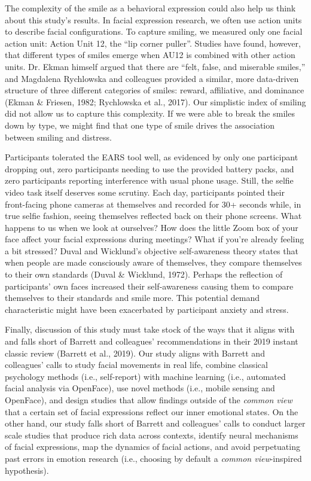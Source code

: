 \documentclass[authordate, empirical,issue]{jote-new-article}
\begin{document}
The complexity of the smile as a behavioral expression could also help us think about this study's results. In facial expression research, we often use action units to describe facial configurations. To capture smiling, we measured only one facial action unit: Action Unit 12, the “lip corner puller”. Studies have found, however, that different types of smiles emerge when AU12 is combined with other action units. Dr. Ekman himself argued that there are “felt, false, and miserable smiles,” and Magdalena Rychlowska and colleagues provided a similar, more data-driven structure of three different categories of smiles: reward, affiliative, and dominance (Ekman \& Friesen, 1982; Rychlowska et al., 2017). Our simplistic index of smiling did not allow us to capture this complexity. If we were able to break the smiles down by type, we might find that one type of smile drives the association between smiling and distress.



Participants tolerated the EARS tool well, as evidenced by only one participant dropping out, zero participants needing to use the provided battery packs, and zero participants reporting interference with usual phone usage. Still, the selfie video task itself deserves some scrutiny. Each day, participants pointed their front-facing phone cameras at themselves and recorded for 30+ seconds while, in true selfie fashion, seeing themselves reflected back on their phone screens. What happens to us when we look at ourselves? How does the little Zoom box of your face affect your facial expressions during meetings? What if you're already feeling a bit stressed? Duval and Wicklund's objective self-awareness theory states that when people are made consciously aware of themselves, they compare themselves to their own standards (Duval \& Wicklund, 1972). Perhaps the reflection of participants' own faces increased their self-awareness causing them to compare themselves to their standards and smile more. This potential demand characteristic might have been exacerbated by participant anxiety and stress.



Finally, discussion of this study must take stock of the ways that it aligns with and falls short of Barrett and colleagues' recommendations in their 2019 instant classic review (Barrett et al., 2019). Our study aligns with Barrett and colleagues' calls to study facial movements in real life, combine classical psychology methods (i.e., self-report) with machine learning (i.e., automated facial analysis via OpenFace), use novel methods (i.e., mobile sensing and OpenFace), and design studies that allow findings outside of the \emph{common view} that a certain set of facial expressions reflect our inner emotional states. On the other hand, our study falls short of Barrett and colleagues' calls to conduct larger scale studies that produce rich data across contexts, identify neural mechanisms of facial expressions, map the dynamics of facial actions, and avoid perpetuating past errors in emotion research (i.e., choosing by default a \emph{common view}-inspired hypothesis).
\end{document}
